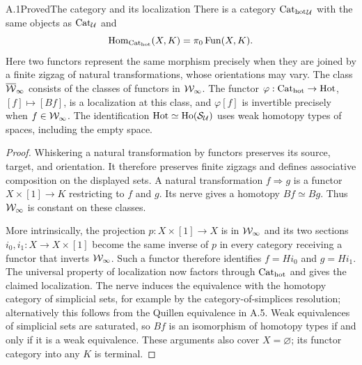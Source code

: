 
\begin{claim}{A.1}{Proved}{The category and its localization}
There is a category ${\mathrm{Cat}_{\mathrm{hot}}}_\mathcal U$ with the same objects as $\mathrm{Cat}_\mathcal U$ and
\[
 \operatorname{Hom}_{{\mathrm{Cat}_{\mathrm{hot}}}}(X,K)=\pi _0\operatorname{Fun}(X,K).
\]
Here two functors represent the same morphism precisely when they are joined by a finite zigzag of natural transformations, whose orientations may vary. The class $\overline{\mathcal W}_\infty$ consists of the classes of functors in $\mathcal W_\infty$. The functor
$\varphi:{\mathrm{Cat}_{\mathrm{hot}}}\to\mathrm{Hot}$, $[f]\mapsto[Bf]$, is a localization at this class, and
$\varphi[f]$ is invertible precisely when $f\in\mathcal W_\infty$. The identification
$\mathrm{Hot}\simeq\operatorname{Ho}(\mathcal S_\mathcal U)$ uses weak homotopy types of spaces, including the empty space.
\end{claim}
\begin{proof}
Whiskering a natural transformation by functors preserves its source, target, and orientation. It therefore preserves finite zigzags and defines associative composition on the displayed sets. A natural transformation $f\Rightarrow g$ is a functor $X\times[1]\to K$ restricting to $f$ and $g$. Its nerve gives a homotopy $Bf\simeq Bg$. Thus $\mathcal W_\infty$ is constant on these classes.

More intrinsically, the projection $p:X\times[1]\to X$ is in $\mathcal W_\infty$ and its two sections $i_0,i_1:X\to X\times[1]$ become the same inverse of $p$ in every category receiving a functor that inverts $\mathcal W_\infty$. Such a functor therefore identifies $f=Hi_0$ and $g=Hi_1$. The universal property of localization now factors through ${\mathrm{Cat}_{\mathrm{hot}}}$ and gives the claimed localization. The nerve induces the equivalence with the homotopy category of simplicial sets, for example by the category-of-simplices resolution; alternatively this follows from the Quillen equivalence in A.5. Weak equivalences of simplicial sets are saturated, so $Bf$ is an isomorphism of homotopy types if and only if it is a weak equivalence. These arguments also cover $X=\varnothing$; its functor category into any $K$ is terminal.
\end{proof}

